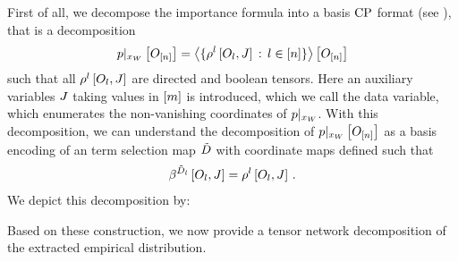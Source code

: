 First of all, we decompose the importance formula into a basis $\mathrm{CP}$ format (see ), that is a decomposition
\begin{align*}
    {p}|_{x_{W}} \left[O_{[n]}\right]
    = \left\langle 
        \{\rho^{l}\left[O_{l},J\right] \, : \, l\in[n] \}
    \right\rangle \left[ O_{[n]} \right]
\end{align*}
such that all $\rho^{l}\left[O_{l},J\right]$ are directed and boolean tensors.
Here an auxiliary variables $J$ taking values in $[m]$ is introduced, which we call the data variable, which enumerates the non-vanishing coordinates of ${p}|_{x_{W}}$.
With this decomposition, we can understand the decomposition of ${p}|_{x_{W}} \left[O_{[n]}\right]$ as a basis encoding of an term selection map $\tilde{D}$ with coordinate maps defined such that
\begin{align*}
    \beta^{\tilde{D}_{l}}\left[O_{l},J\right]
    = \rho^{l}\left[O_{l},J\right] \, .
\end{align*}
We depict this decomposition by:
\begin{center}
    
\end{center}

Based on these construction, we now provide a tensor network decomposition of the extracted empirical distribution.


